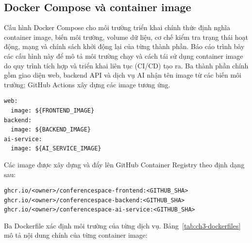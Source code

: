 \subsection{Docker Compose và container image}

Cấu hình Docker Compose cho môi trường triển khai chính thức định nghĩa container image, biến môi trường, volume dữ liệu, cơ chế kiểm tra trạng thái hoạt động, mạng và chính sách khởi động lại của từng thành phần. Báo cáo trình bày các cấu hình này để mô tả môi trường chạy và cách tái sử dụng container image do quy trình tích hợp và triển khai liên tục (CI/CD) tạo ra. Ba thành phần chính gồm giao diện web, backend API và dịch vụ AI nhận tên image từ các biến môi trường; GitHub Actions xây dựng các image tương ứng.

\begin{lstlisting}
web:
  image: ${FRONTEND_IMAGE}
backend:
  image: ${BACKEND_IMAGE}
ai-service:
  image: ${AI_SERVICE_IMAGE}
\end{lstlisting}

Các image được xây dựng và đẩy lên GitHub Container Registry theo định dạng sau:

\begin{lstlisting}
ghcr.io/<owner>/conferencespace-frontend:<GITHUB_SHA>
ghcr.io/<owner>/conferencespace-backend:<GITHUB_SHA>
ghcr.io/<owner>/conferencespace-ai-service:<GITHUB_SHA>
\end{lstlisting}

Ba Dockerfile xác định môi trường của từng dịch vụ. Bảng~\ref{tab:ch3-dockerfiles} mô tả nội dung chính của từng container image:

